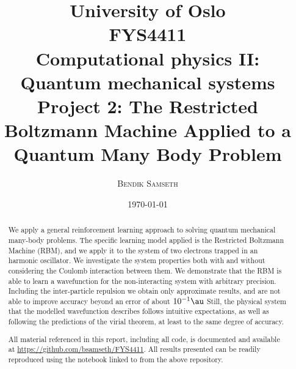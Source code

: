 \documentclass[a4paper, 11pt]{article}
\title{ \small
University of Oslo\\
FYS4411\\
Computational physics II: Quantum mechanical systems\\
\huge Project 2: The Restricted Boltzmann Machine Applied to a Quantum Many Body Problem}
\author{\textsc{Bendik Samseth}}
\date{\today}
\begin{document}
\maketitle

\begin{abstract}
    We apply a general reinforcement learning approach to solving quantum
    mechanical many-body problems. The specific learning model applied is the
    Restricted Boltzmann Machine (RBM), and we apply it to the system of two electrons trapped
    in an harmonic oscillator. We investigate the system properties both with
    and without considering the Coulomb interaction between them. We demonstrate
    that the RBM is able to learn a wavefunction for the non-interacting system
    with arbitrary precision. Including the inter-particle repulsion we obtain
    only approximate results, and are not able to improve accuracy beyond 
    an error of about $10^{-1}\si{\au}$ Still, the physical system that the modelled
    wavefunction describes follows intuitive expectations, as well as
    following the predictions of the virial theorem, at least to the same degree
    of accuracy.

    All material referenced in this report, including all code, is documented
    and available at \url{https://github.com/bsamseth/FYS4411}. All results
    presented can be readily reproduced using the notebook linked to from the
    above repository.
\end{abstract}


\pagebreak
{}
\tableofcontents
\end{document}
